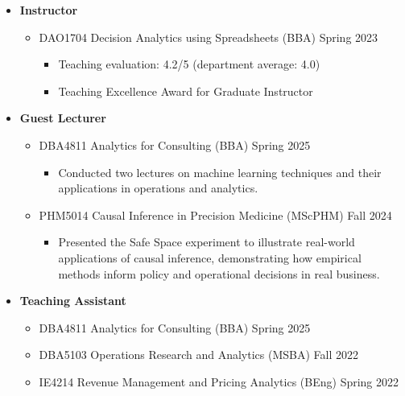 \documentclass[12pt, a4paper]{article}
\begin{document}
{\begin{itemize}
	\item[] \textbf{Instructor}
	\begin{itemize}
		\item DAO1704 Decision Analytics using Spreadsheets (BBA) \hfill Spring 2023
		\begin{itemize}
			\item {\footnotesize Teaching evaluation: 4.2/5 (department average: 4.0)}
			\item {\footnotesize Teaching Excellence Award for Graduate Instructor}
		\end{itemize}
	\end{itemize}

	\item[] \textbf{Guest Lecturer}
	\begin{itemize}
		\item DBA4811 Analytics for Consulting (BBA) \hfill Spring 2025
		\begin{itemize}
			\item {\footnotesize Conducted two lectures on machine learning techniques and their applications in operations and analytics.}
		\end{itemize}
		\item PHM5014 Causal Inference in Precision Medicine (MScPHM) \hfill Fall 2024
		\begin{itemize}
			\item {\footnotesize Presented the Safe Space experiment to illustrate real-world applications of causal inference, demonstrating how empirical methods inform policy and operational decisions in real business.}
		\end{itemize}
	\end{itemize}

	\item[] \textbf{Teaching Assistant}
	\begin{itemize}
		\item DBA4811 Analytics for Consulting (BBA) \hfill Spring 2025
		\item DBA5103 Operations Research and Analytics (MSBA) \hfill Fall 2022
		\item IE4214 Revenue Management and Pricing Analytics (BEng) \hfill Spring 2022
	\end{itemize}
\end{itemize}


}
\end{document}
